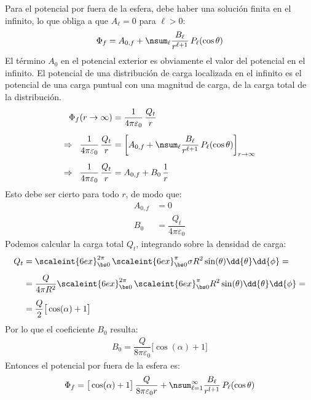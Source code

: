 \begin{enumerate}
Para el potencial por fuera de la esfera, debe haber una solución finita en el infinito, lo que obliga a que $A_{\ell} = 0$ para $\ell > 0$:
\begin{align*}
\Phi_{f} = A_{0, f} + \nsum_{\ell} \dfrac{B_{\ell}}{r^{\ell+1}} \, P_{\ell} (\cos \theta)
\end{align*}
El término $A_{0}$ en el potencial exterior es obviamente el valor del potencial en el infinito. El potencial de una distribución de carga localizada en el infinito es el potencial de una carga puntual con una magnitud de carga, de la carga total de la distribución.
\begin{align*}
\Phi_{f} (r \to \infty) &= \dfrac{1}{4 \pi \varepsilon_{0}} \, \dfrac{Q_{t}}{r} \\[0.5em]
\Rightarrow \hspace{0.2cm} \dfrac{1}{4 \pi \varepsilon_{0}} \, \dfrac{Q_{t}}{r} &= \bigg[ A_{0, f} + \nsum_{\ell} \dfrac{B_{\ell}}{r^{\ell+1}} \, P_{\ell} (\cos \theta) \bigg]_{r \to \infty} \\[0.5em]
\Rightarrow \hspace{0.2cm} \dfrac{1}{4 \pi \varepsilon_{0}} \, \dfrac{Q_{t}}{r} &= A_{0,f} + B_{0} \, \dfrac{1}{r}
\end{align*}
Esto debe ser cierto para todo $r$, de modo que:
\begin{align*}
A_{0,f} &= 0 \\[0.5em]
B_{0} &= \dfrac{Q_{t}}{4 \pi \varepsilon_{0}}
\end{align*}
Podemos calcular la carga total $Q_{t}$, integrando sobre la densidad de carga:
\begin{align*}
Q_{t} &= \scaleint{6ex}_{\bs 0}^{2 \pi} \, \scaleint{6ex}_{\bs 0}^{\pi} \sigma R^{2} \sin (\theta) \dd{\theta} \dd{\phi} = \\[0.5em]
&= \dfrac{Q}{4 \pi R^{2}} \scaleint{6ex}_{\bs 0}^{2 \pi} \, \scaleint{6ex}_{\bs 0}^{\pi} R^{2} \sin (\theta) \dd{\theta} \dd{\phi} = \\[0.5em]
&= \dfrac{Q}{2} \big[ \cos (\alpha) + 1 \big]
\end{align*}
Por lo que el coeficiente $B_{0}$ resulta:
\begin{align*}
B_{0} = \dfrac{Q}{8 \pi \varepsilon_{0}} \big[ \cos (\alpha) + 1 \big]
\end{align*}
Entonces el potencial por fuera de la esfera es:
\begin{align*}
\Phi_{f} = \big[ \cos (\alpha) + 1 \big] \, \dfrac{Q}{8 \pi \varepsilon_{0} r} + \nsum_{\ell=1}^{\infty} \dfrac{B_{\ell}}{r^{l+1}} \, P_{\ell} (\cos \theta)

\end{align*}
\end{enumerate}
